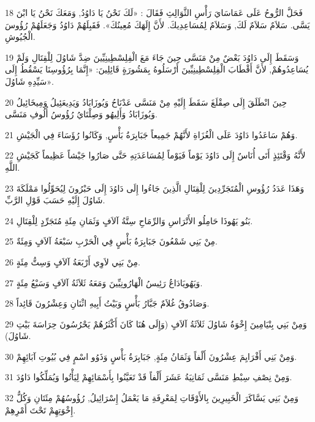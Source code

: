 \par 18 فَحَلَّ الرُّوحُ عَلَى عَمَاسَايَ رَأْسِ الثَّوَالِثِ فَقَالَ : «لَكَ نَحْنُ يَا دَاوُدُ, وَمَعَكَ نَحْنُ يَا ابْنَ يَسَّى. سَلاَمٌ سَلاَمٌ لَكَ, وَسَلاَمٌ لِمُسَاعِدِيكَ. لأَنَّ إِلَهَكَ مُعِينُكَ». فَقَبِلَهُمْ دَاوُدُ وَجَعَلَهُمْ رُؤُوسَ الْجُيُوشِ.
\par 19 وَسَقَطَ إِلَى دَاوُدَ بَعْضٌ مِنْ مَنَسَّى حِينَ جَاءَ مَعَ الْفِلِسْطِينِيِّينَ ضِدَّ شَاوُلَ لِلْقِتَالِ وَلَمْ يُسَاعِدُوهُمْ, لأَنَّ أَقْطَابَ الْفِلِسْطِينِيِّينَ أَرْسَلُوهُ بِمَشُورَةٍ قَائِلِينَ: «إِنَّمَا بِرُؤُوسِنَا يَسْقُطُ إِلَى سَيِّدِهِ شَاوُلَ».
\par 20 حِينَ انْطَلَقَ إِلَى صِقْلَغَ سَقَطَ إِلَيْهِ مِنْ مَنَسَّى عَدْنَاحُ وَيُوزَابَادُ وَيَدِيعَئِيلُ وَمِيخَائِيلُ وَيُوزَابَادُ وَأَلِيهُو وَصِلْتَايُ رُؤُوسُ أُلُوفِ مَنَسَّى.
\par 21 وَهُمْ سَاعَدُوا دَاوُدَ عَلَى الْغُزَاةِ لأَنَّهُمْ جَمِيعاً جَبَابِرَةُ بَأْسٍ, وَكَانُوا رُؤَسَاءَ فِي الْجَيْشِ.
\par 22 لأَنَّهُ وَقْتَئِذٍ أَتَى أُنَاسٌ إِلَى دَاوُدَ يَوْماً فَيَوْماً لِمُسَاعَدَتِهِ حَتَّى صَارُوا جَيْشاً عَظِيماً كَجَيْشِ اللَّهِ.
\par 23 وَهَذَا عَدَدُ رُؤُوسِ الْمُتَجَرِّدِينَ لِلْقِتَالِ الَّذِينَ جَاءُوا إِلَى دَاوُدَ إِلَى حَبْرُونَ لِيُحَوِّلُوا مَمْلَكَةَ شَاوُلَ إِلَيْهِ حَسَبَ قَوْلِ الرَّبِّ.
\par 24 بَنُو يَهُوذَا حَامِلُو الأَتْرَاسِ وَالرِّمَاحِ سِتَّةُ آلاَفٍ وَثَمَانِ مِئَةِ مُتَجَرِّدٍ لِلْقِتَالِ.
\par 25 مِنْ بَنِي شَمْعُونَ جَبَابِرَةُ بَأْسٍ فِي الْحَرْبِ سَبْعَةُ آلاَفٍ وَمِئَةٌ.
\par 26 مِنْ بَنِي لاَوِي أَرْبَعَةُ آلاَفٍ وَسِتُّ مِئَةٍ.
\par 27 وَيَهُويَادَاعُ رَئِيسُ الْهَارُونِيِّينَ وَمَعَهُ ثَلاَثَةُ آلاَفٍ وَسَبْعُ مِئَةٍ.
\par 28 وَصَادُوقُ غُلاَمٌ جَبَّارُ بَأْسٍ وَبَيْتُ أَبِيهِ اثْنَانِ وَعِشْرُونَ قَائِداً.
\par 29 وَمِنْ بَنِي بِنْيَامِينَ إِخْوَةُ شَاوُلَ ثَلاَثَةُ آلاَفٍ (وَإِلَى هُنَا كَانَ أَكْثَرُهُمْ يَحْرُسُونَ حِرَاسَةَ بَيْتِ شَاوُلَ).
\par 30 وَمِنْ بَنِي أَفْرَايِمَ عِشْرُونَ أَلْفاً وَثَمَانُ مِئَةٍ, جَبَابِرَةُ بَأْسٍ وَذَوُو اسْمٍ فِي بُيُوتِ آبَائِهِمْ.
\par 31 وَمِنْ نِصْفِ سِبْطِ مَنَسَّى ثَمَانِيَةُ عَشَرَ أَلْفاً قَدْ تَعَيَّنُوا بِأَسْمَائِهِمْ لِيَأْتُوا وَيُمَلِّكُوا دَاوُدَ.
\par 32 وَمِنْ بَنِي يَسَّاكَرَ الْخَبِيرِينَ بِالأَوْقَاتِ لِمَعْرِفَةِ مَا يَعْمَلُ إِسْرَائِيلُ, رُؤُوسُهُمْ مِئَتَانِ وَكُلُّ إِخْوَتِهِمْ تَحْتَ أَمْرِهِمْ.
